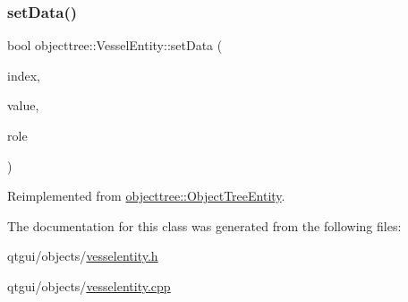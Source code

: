 \subsubsection{\texorpdfstring{setData()}{setData()}}
{\footnotesize\ttfamily bool objecttree\+::\+Vessel\+Entity\+::set\+Data (\begin{DoxyParamCaption}\item[{const Q\+Model\+Index \&}]{index,  }\item[{const Q\+Variant \&}]{value,  }\item[{int}]{role }\end{DoxyParamCaption})\hspace{0.3cm}{\ttfamily [virtual]}}



Reimplemented from \mbox{\hyperlink{classobjecttree_1_1_object_tree_entity_ab6742194e637093cb1571998bee88ff5}{objecttree\+::\+Object\+Tree\+Entity}}.



The documentation for this class was generated from the following files\+:\begin{DoxyCompactItemize}
\item 
qtgui/objects/\mbox{\hyperlink{vesselentity_8h}{vesselentity.\+h}}\item 
qtgui/objects/\mbox{\hyperlink{vesselentity_8cpp}{vesselentity.\+cpp}}\end{DoxyCompactItemize}
